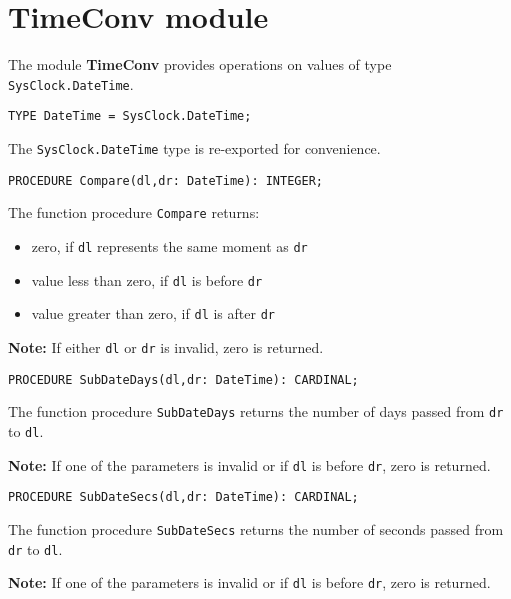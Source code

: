 \section{TimeConv module}
\renewcommand{\ModuleI}{TimeConv}
\OneModule

The \mt{} module {\bf TimeConv} provides operations on
values of type \verb'SysClock.DateTime'. %

{\samepage
{}
\begin{verbatim}
TYPE DateTime = SysClock.DateTime;
\end{verbatim}
}
\ModuleList
The \verb'SysClock.DateTime' type is re-exported for convenience.

{\samepage
{}
\begin{verbatim}
PROCEDURE Compare(dl,dr: DateTime): INTEGER;
\end{verbatim}
}
\ModuleList
The function procedure \verb'Compare' returns:
\begin{itemize}
\item zero, if \verb'dl' represents the same moment as \verb'dr'
\item value less than zero, if \verb'dl' is before \verb'dr'
\item value greater than zero, if \verb'dl' is after \verb'dr'
\end{itemize}

{\bf Note:} If either \verb'dl' or \verb'dr' is invalid, zero is returned.

{\samepage
{}
\begin{verbatim}
PROCEDURE SubDateDays(dl,dr: DateTime): CARDINAL;
\end{verbatim}
}
\ModuleList
The function procedure \verb'SubDateDays' returns the number of days
passed from \verb'dr' to \verb'dl'.

{\bf Note:} If one of the parameters is invalid or if \verb'dl' is before
\verb'dr', zero is returned.

{\samepage
{}
\begin{verbatim}
PROCEDURE SubDateSecs(dl,dr: DateTime): CARDINAL;
\end{verbatim}
}
\ModuleList
The function procedure \verb'SubDateSecs' returns the number of seconds
passed from \verb'dr' to \verb'dl'.

{\bf Note:} If one of the parameters is invalid or if \verb'dl' is before
\verb'dr', zero is returned.

